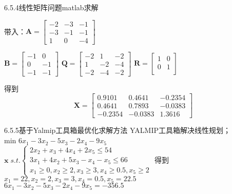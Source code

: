 \documentclass[12pt]{beamer}
\begin{document}
\begin{frame}[allowframebreaks]{6.5.4线性矩阵问题matlab求解}

带入：$\boldsymbol{A}=\begin{bmatrix}
-2 & -3 & -1\\ 
-3 & -1 & -1\\ 
1 & 0 & -4
\end{bmatrix}$

$\boldsymbol{B}=\begin{bmatrix}
-1 & 0 \\ 
0 & -1\\ 
-1 & -1
\end{bmatrix}$
$\boldsymbol{Q}=\begin{bmatrix}
-2 & 1 & -2\\ 
1 & -2 & -4\\ 
-2 & -4 & -2
\end{bmatrix}$
$\boldsymbol{R}=\begin{bmatrix}
1 & 0 \\ 
0 & 1\\ 
\end{bmatrix}$

得到\[\boldsymbol{X}=\begin{bmatrix}
0.9101 & 0.4641 & -0.2354\\ 
0.4641 & 0.7893 & -0.0383\\ 
-0.2354 & -0.0383 & 1.3616
\end{bmatrix}\]


\end{frame}

\begin{frame}[allowframebreaks]{6.5.5基于Yalmip工具箱最优化求解方法}
YALMIP工具箱解决线性规划；
\\	\qquad \qquad\qquad\qquad min \qquad 
$
6x_{1}-3x_{2}-5x_{3}-2x_{4}-9x_{5} 
$
\\\qquad\qquad\qquad
  $\textbf{x}\;s.t.
\left\{
\begin{array}{ccc}
2x_{2}+x_{3}+4x_{4}+2x_{5} \leq 54 \\
3x_{1}+4x_{2}+5x_{3}-x_{4}-x_{5} \leq 66\\
x_{1}\geq 0,x_{2}\geq 2,x_{3}\geq3, x_{4}\geq 0.5,x_{5} \geq 2
\end{array} 
\right.
$
得到$x_{1}=22,x_{2}= 2,x_{3}=3, x_{4}= 0.5,x_{5} = 22.5$
\\$
6x_{1}-3x_{2}-5x_{3}-2x_{4}-9x_{5} =-356.5
$

\end{frame}
\end{document}
